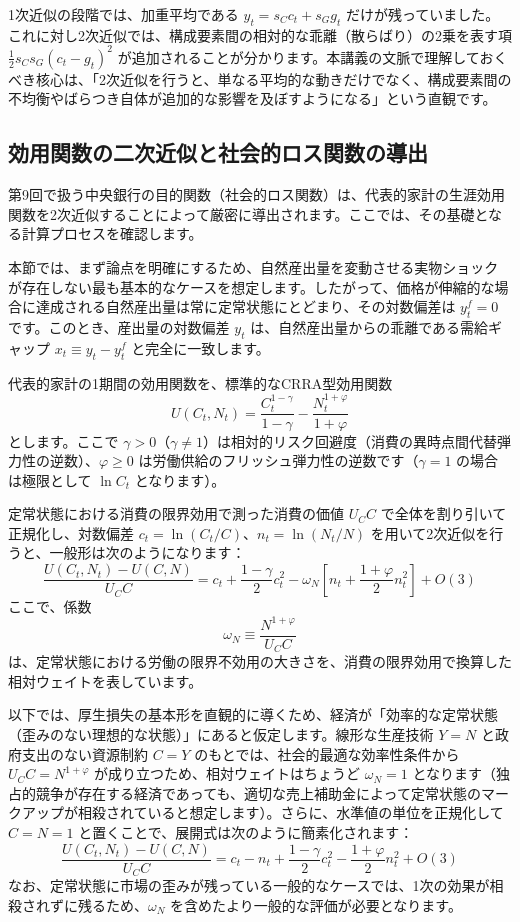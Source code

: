 \documentclass[
  japanese,
  lualatex,
  ja=standard,
  12pt,
  a4paper]{ltjsarticle}
\begin{document}
1次近似の段階では、加重平均である \(y_t=s_Cc_t+s_Gg_t\)
だけが残っていました。これに対し2次近似では、構成要素間の相対的な乖離（散らばり）の2乗を表す項
\(\frac{1}{2}s_Cs_G(c_t-g_t)^2\)
が追加されることが分かります。本講義の文脈で理解しておくべき核心は、「2次近似を行うと、単なる平均的な動きだけでなく、構成要素間の不均衡やばらつき自体が追加的な影響を及ぼすようになる」という直観です。

\subsection{効用関数の二次近似と社会的ロス関数の導出}\label{ux52b9ux7528ux95a2ux6570ux306eux4e8cux6b21ux8fd1ux4f3cux3068ux793eux4f1aux7684ux30edux30b9ux95a2ux6570ux306eux5c0eux51fa}

第9回で扱う中央銀行の目的関数（社会的ロス関数）は、代表的家計の生涯効用関数を2次近似することによって厳密に導出されます。ここでは、その基礎となる計算プロセスを確認します。

本節では、まず論点を明確にするため、自然産出量を変動させる実物ショックが存在しない最も基本的なケースを想定します。したがって、価格が伸縮的な場合に達成される自然産出量は常に定常状態にとどまり、その対数偏差は
\(y_t^f=0\) です。このとき、産出量の対数偏差 \(y_t\)
は、自然産出量からの乖離である需給ギャップ \(x_t \equiv y_t - y_t^f\)
と完全に一致します。

代表的家計の1期間の効用関数を、標準的なCRRA型効用関数 \[
U(C_t,N_t)
=
\frac{C_t^{1-\gamma}}{1-\gamma}
-
\frac{N_t^{1+\varphi}}{1+\varphi}
\] とします。ここで
\(\gamma>0\)（\(\gamma\neq1\)）は相対的リスク回避度（消費の異時点間代替弾力性の逆数）、\(\varphi\geq0\)
は労働供給のフリッシュ弾力性の逆数です（\(\gamma=1\) の場合は極限として
\(\ln C_t\) となります）。

定常状態における消費の限界効用で測った消費の価値 \(U_C C\)
で全体を割り引いて正規化し、対数偏差
\(c_t=\ln(C_t/C)\)、\(n_t=\ln(N_t/N)\)
を用いて2次近似を行うと、一般形は次のようになります： \[
\frac{U(C_t,N_t)-U(C,N)}{U_C C}
=
c_t
+\frac{1-\gamma}{2}c_t^2
-\omega_N
\left[
n_t+\frac{1+\varphi}{2}n_t^2
\right]
+O(3)
\] ここで、係数 \[
\omega_N
\equiv
\frac{N^{1+\varphi}}{U_C C}
\]
は、定常状態における労働の限界不効用の大きさを、消費の限界効用で換算した相対ウェイトを表しています。

以下では、厚生損失の基本形を直観的に導くため、経済が「効率的な定常状態（歪みのない理想的な状態）」にあると仮定します。線形な生産技術
\(Y=N\) と政府支出のない資源制約 \(C=Y\)
のもとでは、社会的最適な効率性条件から \(U_C C=N^{1+\varphi}\)
が成り立つため、相対ウェイトはちょうど \(\omega_N=1\)
となります（独占的競争が存在する経済であっても、適切な売上補助金によって定常状態のマークアップが相殺されていると想定します）。さらに、水準値の単位を正規化して
\(C=N=1\) と置くことで、展開式は次のように簡素化されます： \[
\frac{U(C_t,N_t)-U(C,N)}{U_C C}
=
c_t-n_t
+\frac{1-\gamma}{2}c_t^2
-\frac{1+\varphi}{2}n_t^2
+O(3)
\]
なお、定常状態に市場の歪みが残っている一般的なケースでは、1次の効果が相殺されずに残るため、\(\omega_N\)
を含めたより一般的な評価が必要となります。
\end{document}
